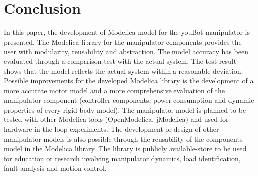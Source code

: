 \section{Conclusion}
\label{sec:Conclusion}
In this paper, the development of Modelica model for the youBot manipulator is presented.
The Modelica library for the manipulator components provides the user with modularity, reusability and abstraction.
The model accuracy has been evaluated through a comparison test with the actual system.
The test result shows that the model reflects the actual system within a reasonable deviation. 
Possible improvements for the developed Modelica library is the development of a more accurate motor model and a more comprehensive evaluation of the manipulator component (controller components, power consumption and dynamic properties of every rigid body model).
The manipulator model is planned to be tested with other Modelica tools (OpenModelica, jModelica) and used for hardware-in-the-loop experiments.
The development or design of other manipulator models is also possible through the reusability of the components model in the Modelica library.
The library is publicly available\youbot-store to be used for education or research involving manipulator dynamics, load identification, fault analysis and motion control.